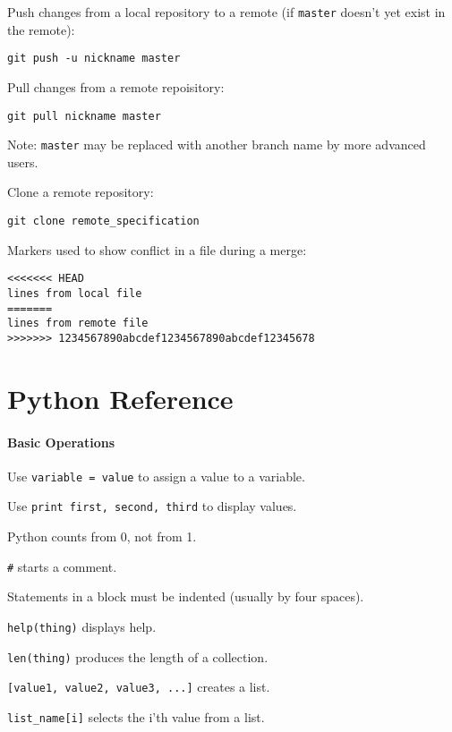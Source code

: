 \documentclass{book}
\begin{document}
Push changes from a local repository to a remote (if \texttt{master}
doesn't yet exist in the remote):

\begin{Verbatim}
git push -u nickname master
\end{Verbatim}

Pull changes from a remote repoisitory:

\begin{Verbatim}
git pull nickname master
\end{Verbatim}

Note: \texttt{master} may be replaced with another branch name by more
advanced users.

Clone a remote repository:

\begin{Verbatim}
git clone remote_specification
\end{Verbatim}

Markers used to show conflict in a file during a merge:

\begin{Verbatim}
<<<<<<< HEAD
lines from local file
=======
lines from remote file
>>>>>>> 1234567890abcdef1234567890abcdef12345678
\end{Verbatim}

\section{Python Reference}

\mbox{}\paragraph{Basic Operations}

\begin{swcitemize}
\item
  Use \texttt{variable = value} to assign a value to a variable.
\item
  Use \texttt{print first, second, third} to display values.
\item
  Python counts from 0, not from 1.
\item
  \texttt{\#} starts a comment.
\item
  Statements in a block must be indented (usually by four spaces).
\item
  \texttt{help(thing)} displays help.
\item
  \texttt{len(thing)} produces the length of a collection.
\item
  \texttt{{[}value1, value2, value3, ...{]}} creates a list.
\item
  \texttt{list\_name{[}i{]}} selects the i'th value from a list.
\end{swcitemize}
\end{document}
